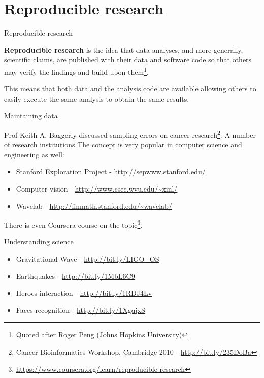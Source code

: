 \documentclass[11pt]{beamer}
\begin{document}
\section{Reproducible research}

\begin{frame}[fragile]{Reproducible research}

\textbf{Reproducible research} is the idea that data analyses, and more generally, scientific claims, are published with their data and software code so that others may verify the findings and build upon them\footnote[frame]{Quoted after Roger Peng (Johns Hopkins University)}.

\bigskip
This means that both data and the analysis code are available allowing others to easily execute the same analysis to obtain the same results.

\end{frame}

\begin{frame}[fragile]{Maintaining data}

Prof Keith A. Baggerly discussed sampling errors on cancer research\footnote{Cancer Bioinformatics Workshop, Cambridge 2010 - \url{http://bit.ly/235DoBa}}. A number of research institutions The concept is very popular in computer science and engineering as well:

\begin{itemize}
	\item Stanford Exploration Project - \url{http://sepwww.stanford.edu/}
	\item Computer vision - \url{http://www.csee.wvu.edu/~xinl/}
	\item Wavelab - \url{http://finmath.stanford.edu/~wavelab/}
\end{itemize}

There is even Coursera course on the topic\footnote{\url{https://www.coursera.org/learn/reproducible-research}}.

\end{frame}


\begin{frame}[fragile]{Understanding science}


\begin{itemize}
	\item Gravitational Wave - \url{http://bit.ly/LIGO_OS}
	\item Earthquakes - \url{http://bit.ly/1MbL6C9}
	\item Heroes interaction - \url{http://bit.ly/1RDJ4Lv}
	\item Faces recognition - \url{http://bit.ly/1XgqjxS}
\end{itemize}

\end{frame}
\end{document}
